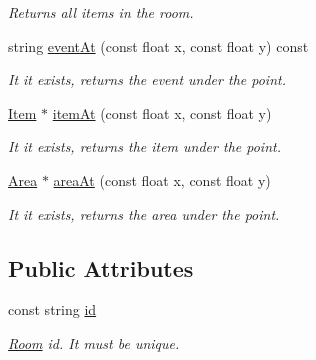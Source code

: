\begin{DoxyCompactItemize}
\begin{DoxyCompactList}\small\item\em Returns all items in the room. \item\end{DoxyCompactList}\item 
\hypertarget{classRoom_a621fa5465c8ec647d1387ed3ee9fe6cd}{
string \hyperlink{classRoom_a621fa5465c8ec647d1387ed3ee9fe6cd}{eventAt} (const float x, const float y) const }
\label{classRoom_a621fa5465c8ec647d1387ed3ee9fe6cd}

\begin{DoxyCompactList}\small\item\em It it exists, returns the event under the point. \item\end{DoxyCompactList}\item 
\hypertarget{classRoom_a7127fc58233aa65b4ce8ae1c1840076f}{
\hyperlink{classItem}{Item} $\ast$ \hyperlink{classRoom_a7127fc58233aa65b4ce8ae1c1840076f}{itemAt} (const float x, const float y)}
\label{classRoom_a7127fc58233aa65b4ce8ae1c1840076f}

\begin{DoxyCompactList}\small\item\em It it exists, returns the item under the point. \item\end{DoxyCompactList}\item 
\hypertarget{classRoom_a021e3f6a87a4cebc90b3900a0efa3afa}{
\hyperlink{classArea}{Area} $\ast$ \hyperlink{classRoom_a021e3f6a87a4cebc90b3900a0efa3afa}{areaAt} (const float x, const float y)}
\label{classRoom_a021e3f6a87a4cebc90b3900a0efa3afa}

\begin{DoxyCompactList}\small\item\em It it exists, returns the area under the point. \item\end{DoxyCompactList}\end{DoxyCompactItemize}
\subsection*{Public Attributes}
\begin{DoxyCompactItemize}
\item 
\hypertarget{classRoom_af9f3d4625d1ec2c9d3bd958c236e56d3}{
const string \hyperlink{classRoom_af9f3d4625d1ec2c9d3bd958c236e56d3}{id}}
\label{classRoom_af9f3d4625d1ec2c9d3bd958c236e56d3}

\begin{DoxyCompactList}\small\item\em \hyperlink{classRoom}{Room} id. It must be unique. \item\end{DoxyCompactList}\end{DoxyCompactItemize}
